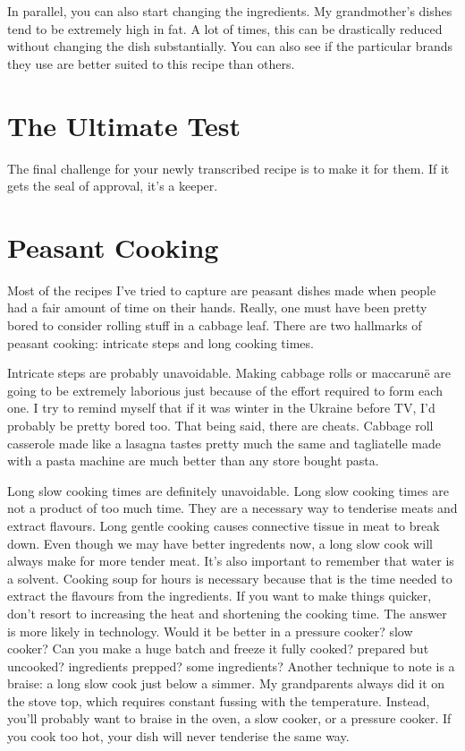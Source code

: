 In parallel, you can also start changing the ingredients. My grandmother's dishes tend to be extremely high in fat. A lot of times, this can be drastically reduced without changing the dish substantially. You can also see if the particular brands they use are better suited to this recipe than others.

\section{The Ultimate Test}
The final challenge for your newly transcribed recipe is to make it for them. If it gets the seal of approval, it's a keeper.

\section{Peasant Cooking}
Most of the recipes I've tried to capture are peasant dishes made when people had a fair amount of time on their hands. Really, one must have been pretty bored to consider rolling stuff in a cabbage leaf. There are two hallmarks of peasant cooking: intricate steps and long cooking times.

Intricate steps are probably unavoidable. Making cabbage rolls or maccarunë are going to be extremely laborious just because of the effort required to form each one. I try to remind myself that if it was winter in the Ukraine before TV, I'd probably be pretty bored too. That being said, there are cheats. Cabbage roll casserole made like a lasagna tastes pretty much the same and tagliatelle made with a pasta machine are much better than any store bought pasta.

Long slow cooking times are definitely unavoidable. Long slow cooking times are not a product of too much time. They are a necessary way to tenderise meats and extract flavours. Long gentle cooking causes connective tissue in meat to break down. Even though we may have better ingredents now, a long slow cook will always make for more tender meat. It's also important to remember that water is a solvent. Cooking soup for hours is necessary because that is the time needed to extract the flavours from the ingredients. If you want to make things quicker, don't resort to increasing the heat and shortening the cooking time. The answer is more likely in technology. Would it be better in a pressure cooker? slow cooker? Can you make a huge batch and freeze it fully cooked? prepared but uncooked? ingredients prepped? some ingredients? Another technique to note is a braise: a long slow cook just below a simmer. My grandparents always did it on the stove top, which requires constant fussing with the temperature. Instead, you'll probably want to braise in the oven, a slow cooker, or a pressure cooker. If you cook too hot, your dish will never tenderise the same way.

